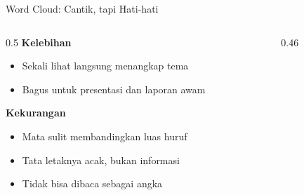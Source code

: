 \documentclass[aspectratio=169,t]{beamer}
\begin{document}
\begin{frame}{Word Cloud: Cantik, tapi Hati-hati}
  \begin{columns}[T]
    \begin{column}{0.5\textwidth}
      \textcolor{nvgreen}{\textbf{Kelebihan}}
      \begin{itemize}
        \footnotesize
        \item Sekali lihat langsung menangkap tema
        \item Bagus untuk presentasi dan laporan awam
      \end{itemize}
      \vspace{0.4em}
      \textcolor{nvred}{\textbf{Kekurangan}}
      \begin{itemize}
        \footnotesize
        \item Mata sulit membandingkan luas huruf
        \item Tata letaknya acak, bukan informasi
        \item Tidak bisa dibaca sebagai angka
      \end{itemize}
    \end{column}
    \begin{column}{0.46\textwidth}
      \begin{center}
      \end{center}
    \end{column}
  \end{columns}
\end{frame}
\end{document}
